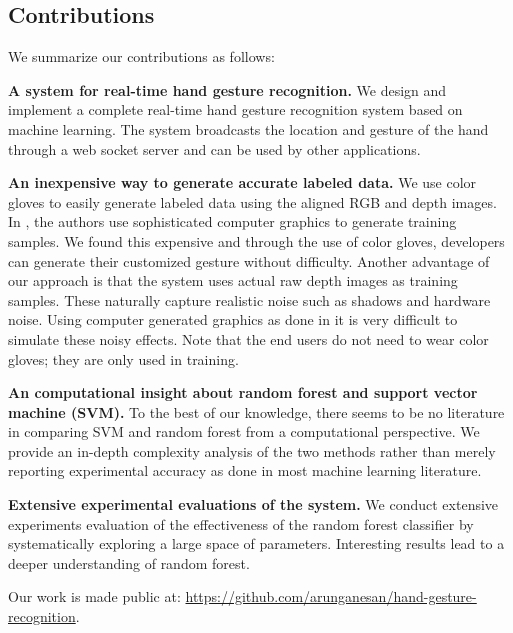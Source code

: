 \subsection{Contributions}
We summarize our contributions as follows:

\textbf{A system for real-time hand gesture recognition.} We design and implement a complete real-time hand gesture recognition system based on machine learning. The system broadcasts the location and gesture of the hand through a web socket server and can be used by other applications.

\textbf{An inexpensive way to generate accurate labeled data.} We use color gloves to easily generate labeled data using the aligned RGB and depth images. In \cite{shotton2011}, the authors use sophisticated computer graphics to generate training samples. We found this expensive and through the use of color gloves, developers can generate their customized gesture without difficulty. Another advantage of our approach is that the system uses actual raw depth images as training samples. These naturally capture realistic noise such as shadows and hardware noise. Using computer generated graphics as done in \cite{shotton2011} it is very difficult to simulate these noisy effects. Note that the end users do not need to wear color gloves; they are only used in training.

\textbf{An computational insight about random forest and support vector machine (SVM).} To the best of our knowledge, there seems to be no literature in comparing SVM and random forest from a computational perspective. We provide an in-depth complexity analysis of the two methods rather than merely reporting experimental accuracy as done in most machine learning literature. 

\textbf{Extensive experimental evaluations of the system.} We conduct extensive experiments evaluation of the effectiveness of the random forest classifier by systematically exploring a large space of parameters. Interesting results lead to a deeper understanding of random forest. 

Our work is made public at: \url{https://github.com/arunganesan/hand-gesture-recognition}.